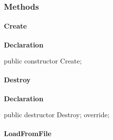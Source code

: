 \documentclass{report}
\newif\ifpdf
\begin{document}
\subsubsection*{\large{\textbf{Methods}}\normalsize\hspace{1ex}\hfill}
\paragraph*{Create}\hspace*{\fill}

\label{opbitmapformats.TOPPicture-Create}
\begin{list}{}{
\setlength{\itemindent}{0cm}
\setlength{\listparindent}{0cm}
\setlength{\leftmargin}{\evensidemargin}
\addtolength{\leftmargin}{\tmplength}
\settowidth{\labelsep}{X}
\addtolength{\leftmargin}{\labelsep}
\setlength{\labelwidth}{\tmplength}
}
\item[\textbf{Declaration}\hfill]
\ifpdf
\begin{flushleft}
\fi
\begin{ttfamily}
public constructor Create;\end{ttfamily}

\ifpdf
\end{flushleft}
\fi

\end{list}
\paragraph*{Destroy}\hspace*{\fill}

\label{opbitmapformats.TOPPicture-Destroy}
\begin{list}{}{
\setlength{\itemindent}{0cm}
\setlength{\listparindent}{0cm}
\setlength{\leftmargin}{\evensidemargin}
\addtolength{\leftmargin}{\tmplength}
\settowidth{\labelsep}{X}
\addtolength{\leftmargin}{\labelsep}
\setlength{\labelwidth}{\tmplength}
}
\item[\textbf{Declaration}\hfill]
\ifpdf
\begin{flushleft}
\fi
\begin{ttfamily}
public destructor Destroy; override;\end{ttfamily}

\ifpdf
\end{flushleft}
\fi

\end{list}
\paragraph*{LoadFromFile}\hspace*{\fill}
\end{document}
